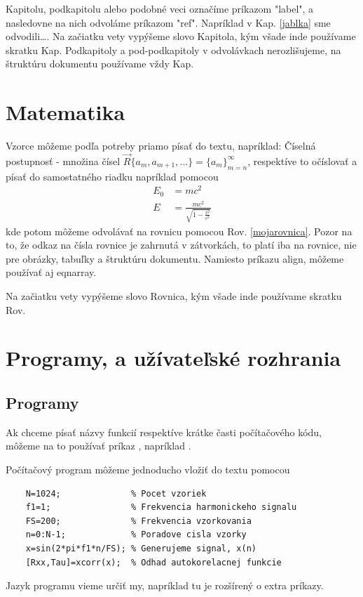 Kapitolu, podkapitolu alebo podobné veci označíme príkazom "label", a nasledovne na nich odvoláme príkazom "ref". Napríklad v Kap. \ref{jablka} sme odvodili\ldots.
Na začiatku vety vypýšeme slovo Kapitola, kým všade inde používame skratku Kap. Podkapitoly a pod-podkapitoly v odvolávkach nerozlišujeme, na štruktúru dokumentu používame vždy Kap.

\section{Matematika}

Vzorce môžeme podľa potreby priamo písať do textu, napríklad: Číselná postupnosť - množina čísel $\vec{R} \{a_m, a_{m+1}, ...\}
= \{a_m\}_{m = n}^\infty$, respektíve to očíslovať a písať do samostatného riadku napríklad pomocou
\begin{align}
	\label{mojarovnica}
	E_0 &= mc^2                              \\
	E &= \frac{mc^2}{\sqrt{1-\frac{v^2}{c^2}}}
\end{align}
kde potom môžeme odvolávať na rovnicu pomocou Rov. \eqref{mojarovnica}. Pozor na to, že odkaz na čísla rovnice je zahrnutá v zátvorkách, to platí iba na rovnice, nie pre obrázky, tabuľky a štruktúru dokumentu. Namiesto príkazu align, môžeme používať aj eqnarray.

Na začiatku vety vypýšeme slovo Rovnica, kým všade inde používame skratku Rov.

\section{Programy, a užívateľské rozhrania}



\subsection{Programy}

Ak chceme písať názvy funkcií respektíve krátke časti počítačového kódu, môžeme na to používať príkaz , napríklad .

Počítačový program môžeme jednoducho vložiť do textu pomocou
\lstset{language=exMatlab}
\begin{lstlisting}
	N=1024;              % Pocet vzoriek
	f1=1;                % Frekvencia harmonickeho signalu
	FS=200;              % Frekvencia vzorkovania
	n=0:N-1;             % Poradove cisla vzorky
	x=sin(2*pi*f1*n/FS); % Generujeme signal, x(n)
	[Rxx,Tau]=xcorr(x);  % Odhad autokorelacnej funkcie
\end{lstlisting}
Jazyk programu vieme určiť my, napríklad  tu je rozšírený o extra príkazy.

